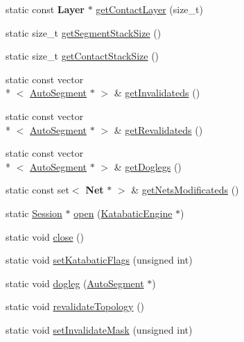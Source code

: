 \begin{DoxyCompactItemize}
\item 
static const {\bf Layer} $\ast$ \hyperlink{classKatabatic_1_1Session_ad3ee60a34f480bd3aecd8c7d957ff52e}{get\-Contact\-Layer} (size\-\_\-t)
\item 
static size\-\_\-t \hyperlink{classKatabatic_1_1Session_ac9c144a8faf97714069824933970923c}{get\-Segment\-Stack\-Size} ()
\item 
static size\-\_\-t \hyperlink{classKatabatic_1_1Session_a0d0c0159030a32b78ab4ad2b58871bce}{get\-Contact\-Stack\-Size} ()
\item 
static const vector\\*
$<$ \hyperlink{classKatabatic_1_1AutoSegment}{Auto\-Segment} $\ast$ $>$ \& \hyperlink{classKatabatic_1_1Session_a6060b7e972f3c0d10cfa158b5ed174e6}{get\-Invalidateds} ()
\item 
static const vector\\*
$<$ \hyperlink{classKatabatic_1_1AutoSegment}{Auto\-Segment} $\ast$ $>$ \& \hyperlink{classKatabatic_1_1Session_af5675d50557db83d11b7d2151de5f34c}{get\-Revalidateds} ()
\item 
static const vector\\*
$<$ \hyperlink{classKatabatic_1_1AutoSegment}{Auto\-Segment} $\ast$ $>$ \& \hyperlink{classKatabatic_1_1Session_a84211b77fe7fb8b49a93d7f298a5de90}{get\-Doglegs} ()
\item 
static const set$<$ {\bf Net} $\ast$ $>$ \& \hyperlink{classKatabatic_1_1Session_a6c3be93d98029b06138f633342d04157}{get\-Nets\-Modificateds} ()
\item 
static \hyperlink{classKatabatic_1_1Session}{Session} $\ast$ \hyperlink{classKatabatic_1_1Session_a000e098850f6cccff6b289a294149a41}{open} (\hyperlink{classKatabatic_1_1KatabaticEngine}{Katabatic\-Engine} $\ast$)
\item 
static void \hyperlink{classKatabatic_1_1Session_a5ae591df94fc66ccb85cbb6565368bca}{close} ()
\item 
static void \hyperlink{classKatabatic_1_1Session_af9919aefa1db2478b3d1813c1872d175}{set\-Katabatic\-Flags} (unsigned int)
\item 
static void \hyperlink{classKatabatic_1_1Session_aed01e83f7d8dc7acd85156256a9e776c}{dogleg} (\hyperlink{classKatabatic_1_1AutoSegment}{Auto\-Segment} $\ast$)
\item 
static void \hyperlink{classKatabatic_1_1Session_a69fc41ca90fae86766ae9d528394868f}{revalidate\-Topology} ()
\item 
static void \hyperlink{classKatabatic_1_1Session_a16f4761496e07b9e836642d1effa1993}{set\-Invalidate\-Mask} (unsigned int)

\end{DoxyCompactItemize}
